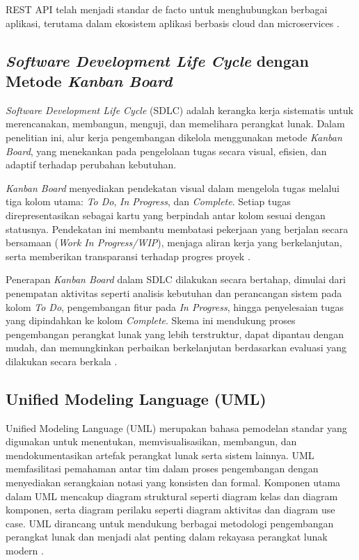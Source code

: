 REST API telah menjadi standar de facto untuk menghubungkan berbagai aplikasi, terutama dalam ekosistem aplikasi berbasis cloud dan microservices \cite{tilkov2010}.

\subsection{\textit{Software Development Life Cycle} dengan Metode \textit{Kanban Board}}

\textit{Software Development Life Cycle} (SDLC) adalah kerangka kerja sistematis untuk merencanakan, membangun, menguji, dan memelihara perangkat lunak. Dalam penelitian ini, alur kerja pengembangan dikelola menggunakan metode \textit{Kanban Board}, yang menekankan pada pengelolaan tugas secara visual, efisien, dan adaptif terhadap perubahan kebutuhan.

\textit{Kanban Board} menyediakan pendekatan visual dalam mengelola tugas melalui tiga kolom utama: \textit{To Do}, \textit{In Progress}, dan \textit{Complete}. Setiap tugas direpresentasikan sebagai kartu yang berpindah antar kolom sesuai dengan statusnya. Pendekatan ini membantu membatasi pekerjaan yang berjalan secara bersamaan (\textit{Work In Progress/WIP}), menjaga aliran kerja yang berkelanjutan, serta memberikan transparansi terhadap progres proyek \cite{anderson2010}.

Penerapan \textit{Kanban Board} dalam SDLC dilakukan secara bertahap, dimulai dari penempatan aktivitas seperti analisis kebutuhan dan perancangan sistem pada kolom \textit{To Do}, pengembangan fitur pada \textit{In Progress}, hingga penyelesaian tugas yang dipindahkan ke kolom \textit{Complete}. Skema ini mendukung proses pengembangan perangkat lunak yang lebih terstruktur, dapat dipantau dengan mudah, dan memungkinkan perbaikan berkelanjutan berdasarkan evaluasi yang dilakukan secara berkala \cite{burrows2014}.


\subsection{Unified Modeling Language (UML)}

Unified Modeling Language (UML) merupakan bahasa pemodelan standar yang digunakan untuk menentukan, memvisualisasikan, membangun, dan mendokumentasikan artefak perangkat lunak serta sistem lainnya. UML memfasilitasi pemahaman antar tim dalam proses pengembangan dengan menyediakan serangkaian notasi yang konsisten dan formal. Komponen utama dalam UML mencakup diagram struktural seperti diagram kelas dan diagram komponen, serta diagram perilaku seperti diagram aktivitas dan diagram use case. UML dirancang untuk mendukung berbagai metodologi pengembangan perangkat lunak dan menjadi alat penting dalam rekayasa perangkat lunak modern \cite{booch2005unified}.

